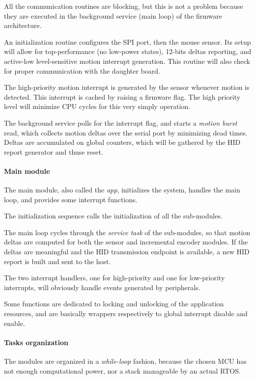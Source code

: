 \documentclass[a4paper,10pt]{article}
\begin{document}
\begin{multicols}{2}
All the communication routines are blocking, but this is not a problem because
they are executed in the background service (main loop) of the firmware
architecture.

An initialization routine configures the SPI port, then the mouse sensor. Its
setup will allow for top-performance (no low-power states), 12-bits deltas
reporting, and active-low level-sensitive motion interrupt generation.
This routine will also check for proper communication with the daughter board.

The high-priority motion interrupt is generated by the sensor whenever motion
is detected. This interrupt is cached by raising a firmware flag. The high
priority level will minimize CPU cycles for this very simply operation.

The background service polls for the interrupt flag, and starts a \emph{motion
burst} read, which collects motion deltas over the serial port by minimizing
dead times. Deltas are accumulated on global counters, which will be gathered
by the HID report generator and thuse reset.


\paragraph{Main module}
The main module, also called the \emph{app}, initializes the system, handles
the main loop, and provides some interrupt functions.

The initialization sequence calls the initialization of all the sub-modules.

The main loop cycles through the \emph{service task} of the sub-modules, so
that motion deltas are computed for both the sensor and incremental encoder
modules. If the deltas are meaningful and the HID transmission endpoint is
available, a new HID report is built and sent to the host.

The two interrupt handlers, one for high-priority and one for low-priority
interrupts, will obviously handle events generated by peripherals.

Some functions are dedicated to locking and unlocking of the application
resources, and are basically wrappers respectively to global interrupt disable
and enable.


\paragraph{Tasks organization}
The modules are organized in a \emph{while-loop} fashion, because the chosen
MCU has not enough computational power, nor a stack manageable by an actual
RTOS.


\end{multicols}
\end{document}
